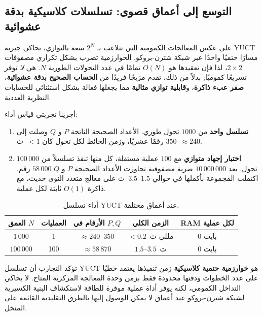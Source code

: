 \documentclass[11pt,a4paper]{article}
\begin{document}
	\subsection{التوسع إلى أعماق قصوى: تسلسلات كلاسيكية بدقة عشوائية}
	
	على عكس المعالجات الكمومية التي تتلاعب بـ $2^N$ سعة بالتوازي، تحاكي جبرية YUCT مسارًا حتميًا واحدًا عبر شبكة شترن-بروكو. الخوارزمية تضرب بشكل تكراري مصفوفات $2\times2$، لذا فإن تعقيدها هو $O(N)$ تمامًا في عدد التحولات الطورية $N$. هي \emph{لا} توفر تسريعًا كموميًا; بدلاً من ذلك، تقدم مزيجًا فريدًا من \textbf{الحساب الصحيح بدقة عشوائية}، \textbf{صفر عبء ذاكرة}، و\textbf{قابلية توازي مثالية} مما يجعلها فعالة بشكل استثنائي للحسابات النظرية العددية.
	
	أجرينا تجربتي قياس أداء:
	
	\begin{enumerate}[leftmargin=*]
		\item \textbf{تسلسل واحد} من $1000$ تحول طوري. الأعداد الصحيحة الناتجة $P$ و $Q$ وصلت إلى $\approx 240$--$350$ رقمًا عشريًا، وزمن الحائط لكل تحول كان $<1$~\textmu ث.
		\item \textbf{اختبار إجهاد متوازي} مع $100$ عملية مستقلة، كل منها تنفذ تسلسلاً من $100\,000$ تحول. بعد $10\,000\,000$ ضربة مصفوفية تجاوزت الأعداد الصحيحة $P$ و $Q$ $58\,000$ رقم. اكتملت المجموعة بأكملها في حوالي $1.5$--$3.5$~ث على معالج متعدد النوى حديث، مع ذاكرة $O(1)$ ثابتة لكل عملية.
	\end{enumerate}
	
	\begin{table}[htbp]
		\centering
		\caption{أداء تسلسل YUCT عند أعماق مختلفة.}
		\label{tab:cascade-bench}
		\begin{tabular}{c c c c c}
			\toprule
			العمق $N$ & العمليات & الأرقام في $P,Q$ & الزمن الكلي & RAM لكل عملية \\
			\midrule
			$1\,000$   & 1   & $\approx 240$--$350$ & $< 0.2$\ مللي ث & 0 بايت \\
			$100\,000$ & 100 & $\approx 58\,870$     & $1.5$--$3.5$\ ث & 0 بايت \\
			\bottomrule
		\end{tabular}
	\end{table}
	
	تؤكد التجارب أن تسلسل YUCT هو \textbf{خوارزمية حتمية كلاسيكية} زمن تنفيذها يعتمد خطيًا على عدد الخطوات ودقتها محدودة فقط بزمن وحدة المعالجة المركزية المتاح. لا يحاكي التداخل الكمومي، لكنه يوفر أداة عملية موفرة للطاقة لاستكشاف البنية الكسيرية لشبكة شترن-بروكو عند أعماق لا يمكن الوصول إليها بالطرق التقليدية القائمة على المنخل.
	
\end{document}

